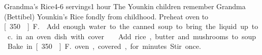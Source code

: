 \begin{recipe}{Grandma's Rice}{4-6 servings}{1 hour}
\freeform The Younkin children remember Grandma (Bettibel) Younkin's Rice fondly from childhood.
\newstep Preheat oven to \unit[350\0]{F.} 
Add enough water to the canned soup to bring the liquid up
to \unit[2]{c.} in an oven dish with cover.
Add rice, butter and mushrooms to soup.
\newstep Bake in \unit[350\0]{F.} oven, covered, for \unit[45]{minutes}.  Stir once.
\end{recipe}
